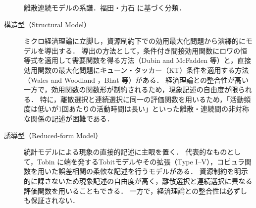 \begin{figure}[htb]
  \centering
  \caption{離散連続モデルの系譜．福田・力石 \cite{FukudaChikaraishi2013} に基づく分類．}
  \label{fig:dc_taxonomy}
\end{figure}

\begin{description}
  \item[構造型（Structural Model）]
    ミクロ経済理論に立脚し，資源制約下での効用最大化問題から演繹的にモデルを導出する．
    導出の方法として，条件付き間接効用関数にロワの恒等式を適用して需要関数を得る方法（Dubin and McFadden \cite{DubinMcFadden1984} 等）と，直接効用関数の最大化問題にキューン・タッカー（KT）条件を適用する方法（Wales and Woodland \cite{WalesWoodland1983}，Bhat \cite{BHAT2008274} 等）がある．
    経済理論との整合性が高い一方で，効用関数の関数形が制約されるため，現象記述の自由度が限られる．
    特に，離散選択と連続選択に同一の評価関数を用いるため，「活動頻度は低いが1回あたりの活動時間は長い」といった離散・連続間の非対称な関係の記述が困難である．
  \item[誘導型（Reduced-form Model）]
    統計モデルによる現象の直接的記述に主眼を置く．
    代表的なものとして，Tobin \cite{Tobin1958} に端を発するTobitモデルやその拡張（Type I--V），コピュラ関数を用いた誤差相関の柔軟な記述を行うモデルがある．
    資源制約を明示的に課さないため現象記述の自由度が高く，離散選択と連続選択に異なる評価関数を用いることもできる．
    一方で，経済理論との整合性は必ずしも保証されない．
\end{description}

